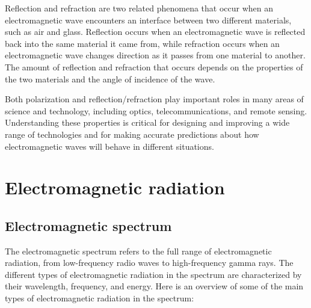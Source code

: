 \documentclass{article}
\begin{document}
Reflection and refraction are two related phenomena that occur when an
electromagnetic wave encounters an interface between two different materials,
such as air and glass. Reflection occurs when an electromagnetic wave is
reflected back into the same material it came from, while refraction occurs
when an electromagnetic wave changes direction as it passes from one material
to another. The amount of reflection and refraction that occurs depends on the
properties of the two materials and the angle of incidence of the wave.

Both polarization and reflection/refraction play important roles in many areas
of science and technology, including optics, telecommunications, and remote
sensing. Understanding these properties is critical for designing and improving
a wide range of technologies and for making accurate predictions about how
electromagnetic waves will behave in different situations.

\section{Electromagnetic radiation} %
\label{sec:Electromagnetic radiation}
\subsection{Electromagnetic spectrum} %
\label{ssub:Electromagnetic spectrum}  
The electromagnetic spectrum refers to the full range of electromagnetic
radiation, from low-frequency radio waves to high-frequency gamma rays. The
different types of electromagnetic radiation in the spectrum are characterized
by their wavelength, frequency, and energy. Here is an overview of some of the
main types of electromagnetic radiation in the spectrum:
\end{document}
